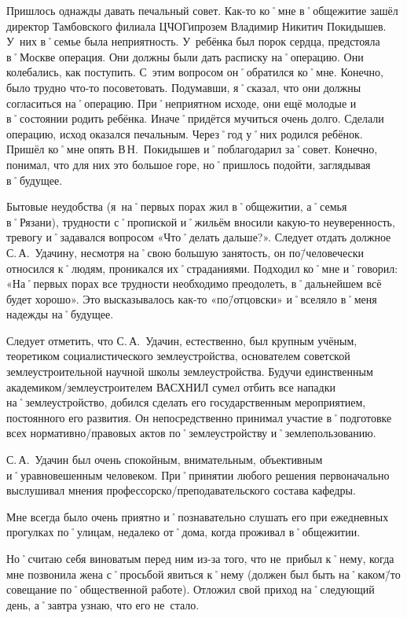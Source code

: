 Пришлось однажды давать печальный совет. Как-то ко˚мне в˚общежитие зашёл директор Тамбовского филиала ЦЧОГипрозем Владимир Никитич Покидышев. У~них в˚семье была неприятность. У~ребёнка был порок сердца, предстояла в˚Москве операция. Они должны были дать расписку на˚операцию. Они колебались, как поступить. С~этим вопросом он˚обратился ко˚мне. Конечно, было трудно что-то посоветовать. Подумавши, я˚сказал, что они должны согласиться на˚операцию. При˚неприятном исходе, они ещё молодые и в˚состоянии родить ребёнка. Иначе˚придётся мучиться очень долго. Сделали операцию, исход оказался печальным. Через˚год у˚них родился ребёнок. Пришёл ко˚мне опять В\,Н.~Покидышев и˚поблагодарил за˚совет. Конечно, понимал, что для них это большое горе, но˚пришлось подойти, заглядывая в˚будущее.

Бытовые неудобства (я~на˚первых порах жил в˚общежитии, а˚семья в˚Рязани), трудности с˚пропиской и˚жильём вносили какую-то неуверенность, тревогу и˚задавался вопросом «Что˚делать дальше?». Следует отдать должное С.\,А.~Удачину, несмотря на˚свою большую занятость, он по\=/человечески относился к˚людям, проникался их˚страданиями. Подходил ко˚мне и˚говорил: «На˚первых порах все трудности необходимо преодолеть, в˚дальнейшем всё будет хорошо». Это высказывалось как-то «по\=/отцовски» и˚вселяло в˚меня надежды на˚будущее.

Следует отметить, что С.\,А.~Удачин, естественно, был крупным учёным, теоретиком социалистического землеустройства, основателем советской землеустроительной научной школы землеустройства. Будучи единственным академиком\-/землеустроителем ВАСХНИЛ сумел отбить все нападки на˚землеустройство, добился сделать его государственным мероприятием, постоянного его развития. Он непосредственно принимал участие в˚подготовке всех нормативно\-/правовых актов по˚землеустройству и˚землепользованию. 

С.\,А.~Удачин был очень спокойным, внимательным, объективным и˚уравновешенным человеком. При˚принятии любого решения первоначально выслушивал мнения профессорско\-/преподавательского состава кафедры. 

Мне всегда было очень приятно и˚познавательно слушать его при ежедневных прогулках по˚улицам, недалеко от˚дома, когда проживал в˚общежитии.

Но˚считаю себя виноватым перед ним из-за того, что не~прибыл к˚нему, когда мне позвонила жена с˚просьбой явиться к˚нему (должен был быть на˚каком\=/то совещание по˚общественной работе). Отложил свой приход на˚следующий день, а˚завтра узнаю, что его не~стало.

